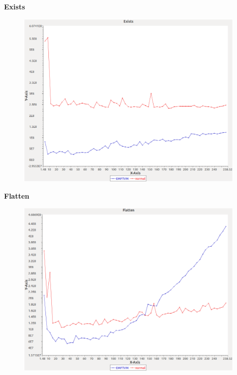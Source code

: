 \noindent\textbf{Exists}

\begin{figure}[h]
\centering
\includegraphics[width=\textwidth]{graphs/bag/Exists}
\end{figure}
\pagebreak

\noindent\textbf{Flatten}

\begin{figure}[h]
\centering
\includegraphics[width=\textwidth]{graphs/bag/Flatten}
\end{figure}
\pagebreak

